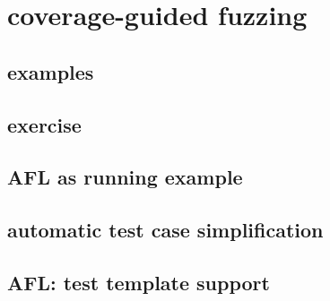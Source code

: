 \section{coverage-guided fuzzing}


\subsection{examples}


\subsection{exercise}


\subsection{AFL as running example}


\subsection{automatic test case simplification}


\subsection{AFL: test template support}



